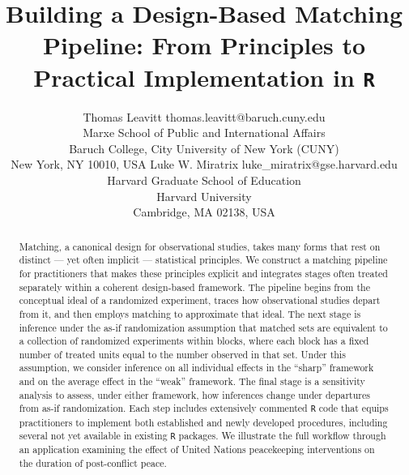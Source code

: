 \documentclass[twoside,11pt]{article}
\begin{document}
\title{Building a Design-Based Matching Pipeline: From Principles to
Practical Implementation in \texttt{R}}

\author{\name Thomas Leavitt \email thomas.leavitt@baruch.cuny.edu \\
       \addr Marxe School of Public and International Affairs \\
       Baruch College, City University of New York (CUNY) \\
       New York, NY 10010, USA
       \AND
       \name Luke W. Miratrix \email luke\_miratrix@gse.harvard.edu \\
       \addr Harvard Graduate School of Education \\
       Harvard University \\
       Cambridge, MA 02138, USA
       }

\maketitle


\begin{abstract}
Matching, a canonical design for observational studies, takes many forms that rest on distinct --- yet often implicit --- statistical principles. We construct a matching pipeline for practitioners that makes these principles explicit and integrates stages often treated separately within a coherent design-based framework. The pipeline begins from the conceptual ideal of a randomized experiment, traces how observational studies depart from it, and then employs matching to approximate that ideal. The next stage is inference under the as-if randomization assumption that matched sets are equivalent to a collection of randomized experiments within blocks, where each block has a fixed number of treated units equal to the number observed in that set. Under this assumption, we consider inference on all individual effects in the ``sharp'' framework and on the average effect in the ``weak'' framework. The final stage is a sensitivity analysis to assess, under either framework, how inferences change under departures from as-if randomization. Each step includes extensively commented \texttt{R} code that equips practitioners to implement both established and newly developed procedures, including several not yet available in existing \texttt{R} packages. We illustrate the full workflow through an application examining the effect of United Nations peacekeeping interventions on the duration of post-conflict peace.
\end{abstract}
\end{document}
